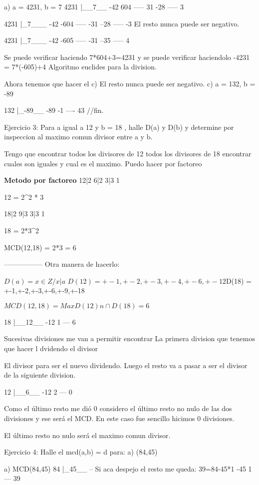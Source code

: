 a) a = 4231, b = 7
 4231 |__7__
-42   604
-----
   31
  -28
-----
    3


 4231 |_7___
-42    -604
-----
  -31
 --28
-----
   -3
El resto nunca puede ser negativo.


 4231 |_7___
-42    -605
-----
  -31
 --35
-----
    4

Se puede verificar haciendo 7*604+3=4231
y se puede verificar haciendolo -4231 = 7*(-605)+4
Algoritmo euclides para la division.

Ahora tenemos que hacer el c)
El resto nunca puede ser negativo.
c) a = 132, b = -89

 132 |_-89__
 -89   -1
----
  43
  //fin.

Ejercicio 3: Para a igual a 12 y b = 18 , halle D(a) y D(b) y determine por inspeccion al maximo comun divisor entre a y b.

Tengo que encontrar todos los divisores de 12 todos los divisores de 18 encontrar cuales son iguales y cual es el maximo.
Puedo hacer por factoreo 

\textbf{Metodo por factoreo}
12|2
 6|2
 3|3
 1


12 = 2^2 * 3


18|2
 9|3
 3|3
 1

18 = 2*3^2


MCD(12,18) = 2*3 = 6

-----------------
Otra manera de hacerlo:

$D(a) = { x \in Z / x|a }$
$D(12) = {+-1,+-2,+-3,+-4,+-6,+-12}
$D(18) = {+-1,+-2,+-3,+-6,+-9,+-18}


$MCD(12,18) = Max {D(12) n\cap D(18)} = 6$


 18 |__12__
-12  1
---
  6




Sucesivas divisiones me van a permitir encontrar
La primera division que tenemos que hacer l dvidendo el divisor

El divisor para ser el nuevo dividendo.
Luego el resto va a pasar a ser el divisor de la siguiente division.

 12 |__6__
-12  2
---
  0

Como el último resto me dió 0 considero el último resto no nulo de las dos divisiones y ese será el MCD.
En este caso fue sencillo hicimos 0 divisiones.


El último resto no nulo será el maximo comun divisor.


Ejercicio 4: Halle el mcd(a,b) = d para:
a) (84,45)

a) MCD(84,45)
 84 |_45__ -- Si aca despejo el resto me queda: 39=84-45*1
-45  1
---
 39

